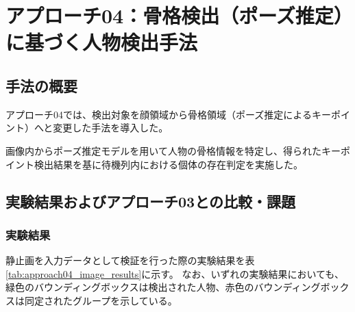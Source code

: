\section{アプローチ04：骨格検出（ポーズ推定）に基づく人物検出手法}

\subsection{手法の概要}
アプローチ04では、検出対象を顔領域から骨格領域（ポーズ推定によるキーポイント）へと変更した手法を導入した。

画像内からポーズ推定モデルを用いて人物の骨格情報を特定し、得られたキーポイント検出結果を基に待機列内における個体の存在判定を実施した。

\subsection{実験結果およびアプローチ03との比較・課題}

\subsubsection{実験結果}
静止画を入力データとして検証を行った際の実験結果を表\ref{tab:approach04_image_results}に示す。
なお、いずれの実験結果においても、緑色のバウンディングボックスは検出された人物、赤色のバウンディングボックスは同定されたグループを示している。

